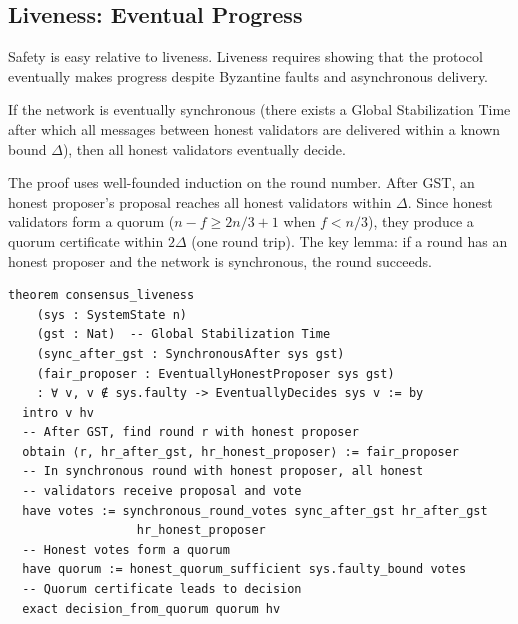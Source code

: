 \subsection{Liveness: Eventual Progress}

Safety is easy relative to liveness. Liveness requires showing that the protocol
eventually makes progress despite Byzantine faults and asynchronous delivery.

\begin{theorem}
If the network is eventually synchronous (there exists a Global Stabilization Time after
which all messages between honest validators are delivered within a known bound $\Delta$),
then all honest validators eventually decide.
\end{theorem}

The proof uses well-founded induction on the round number. After GST, an honest proposer's
proposal reaches all honest validators within $\Delta$. Since honest validators form a
quorum ($n - f \geq 2n/3 + 1$ when $f < n/3$), they produce a quorum certificate within
$2\Delta$ (one round trip). The key lemma: if a round has an honest proposer and the
network is synchronous, the round succeeds.

\begin{lstlisting}[language=Lean,caption={Liveness argument structure}]
theorem consensus_liveness
    (sys : SystemState n)
    (gst : Nat)  -- Global Stabilization Time
    (sync_after_gst : SynchronousAfter sys gst)
    (fair_proposer : EventuallyHonestProposer sys gst)
    : ∀ v, v ∉ sys.faulty -> EventuallyDecides sys v := by
  intro v hv
  -- After GST, find round r with honest proposer
  obtain ⟨r, hr_after_gst, hr_honest_proposer⟩ := fair_proposer
  -- In synchronous round with honest proposer, all honest
  -- validators receive proposal and vote
  have votes := synchronous_round_votes sync_after_gst hr_after_gst
                  hr_honest_proposer
  -- Honest votes form a quorum
  have quorum := honest_quorum_sufficient sys.faulty_bound votes
  -- Quorum certificate leads to decision
  exact decision_from_quorum quorum hv
\end{lstlisting}

